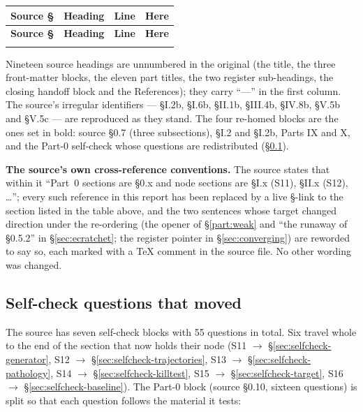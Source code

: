 \begingroup
\footnotesize
\begin{longtable}{@{}L{1.5cm} L{7.3cm} r L{4.3cm}@{}}
\toprule
\textbf{Source \S} & \textbf{Heading} & \textbf{Line} & \textbf{Here} \\
\midrule
\endfirsthead
\toprule
\textbf{Source \S} & \textbf{Heading} & \textbf{Line} & \textbf{Here} \\
\midrule
\endhead
\bottomrule
\endfoot

\end{longtable}
\endgroup

\begin{aside}
Nineteen source headings are unnumbered in the original (the title, the three
front-matter blocks, the eleven part titles, the two register sub-headings, the
closing handoff block and the References); they carry ``---'' in the first
column. The source's irregular identifiers --- \S I.2b, \S I.6b, \S II.1b,
\S III.4b, \S IV.8b, \S V.5b and \S V.5c --- are reproduced as they stand.
The four re-homed blocks are the ones set in bold: source \S0.7 (three
subsections), \S I.2 and \S I.2b, Parts IX and X, and the Part-0 self-check
whose questions are redistributed (\S\ref{app:selfcheckmoves}).
\end{aside}

\begin{aside}
\textbf{The source's own cross-reference conventions.} The source states that
within it ``Part~0 sections are \S0.x and node sections are \S I.x (S11),
\S II.x (S12), \ldots''; every such reference in this report has been replaced
by a live \S-link to the section listed in the table above, and the two
sentences whose target changed direction under the re-ordering (the opener of
\S\ref{part:weak} and ``the runaway of \S0.5.2'' in \S\ref{sec:ecratchet}; the
register pointer in \S\ref{sec:converging}) are reworded to say so, each marked
with a TeX comment in the source file. No other wording was changed.
\end{aside}

\subsection{Self-check questions that moved}
\label{app:selfcheckmoves}

The source has seven self-check blocks with 55 questions in total. Six travel
whole to the end of the section that now holds their node (S11 $\to$
\S\ref{sec:selfcheck-generator}, S12 $\to$ \S\ref{sec:selfcheck-trajectories},
S13 $\to$ \S\ref{sec:selfcheck-pathology}, S14 $\to$
\S\ref{sec:selfcheck-killtest}, S15 $\to$ \S\ref{sec:selfcheck-target}, S16
$\to$ \S\ref{sec:selfcheck-baseline}). The Part-0 block (source \S0.10, sixteen
questions) is split so that each question follows the material it tests:

